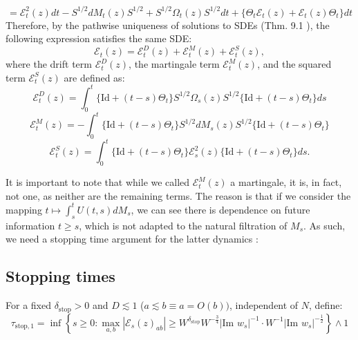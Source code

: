 \documentclass[11pt]{article}
\newcommand{\E}{\mathcal{E}}
\newcommand{\sto}{\text{stop}}
\newcommand{\im}{\text{Im }}
\begin{document}
$$= \E_t^2(z)dt - S^{1/2} dM_t(z)S^{1/2} + S^{1/2} \Omega_t(z) S^{1/2}dt + \{\Theta_t \E_t(z)+\E_t(z)\Theta_t\}dt$$
Therefore, by the pathwise uniqueness of solutions to SDEs (Thm. 9.1 \cite{steele}), the following expression satisfies the same SDE:
\begin{equation*}\E_t(z)=\E_t^{D}(z)+\E_t^{M}(z)+\E_t^{S}(z),\tag{3.3}\end{equation*}
where the drift term $\E^D_t(z)$, the martingale term $\E^M_t(z)$, and the squared term $\E^S_t(z)$ are defined as:
$$\E_t^{D}(z)=\int_0^t \{\text{Id} + (t-s)\Theta_t\} S^{1/2} \Omega_s(z) S^{1/2} \{\text{Id} + (t-s)\Theta_t\}ds$$
$$\E_t^{M}(z)=-\int_0^t \{\text{Id} + (t-s)\Theta_t\}S^{1/2} dM_s(z)S^{1/2}\{\text{Id} +(t-s)\Theta_t\}$$
$$\E_t^{S}(z)=\int_0^t \{\text{Id} + (t-s)\Theta_t\}\E_s^2(z) \{\text{Id} + (t-s)\Theta_t\}ds.$$

\noindent It is important to note that while we called $\E^M_t(z)$ a martingale, it is, in fact, not one, as neither are the remaining terms. The reason is that if we consider the mapping $t\mapsto \int_s^t U(t, s)dM_s$, we can see there is dependence on future information $t\geq s$, which is not adapted to the natural filtration of $M_s$. As such, we need a stopping time argument for the latter dynamics \cite{bandSDE}:

\subsection{Stopping times}
For a fixed $\delta_\sto>0$ and $D\lesssim 1$ ($a\lesssim b\equiv a = O(b))$, independent of $N$, define:
\begin{equation*}
\tau_{\text{stop}, 1}=\inf \left\{s\geq 0: \max_{a, b} |\E_s(z)_{ab}|\geq W^{\delta_{\sto}}W^{-\frac{3}{4}}|\im w_s|^{-1}\cdot W^{-1}|\im w_s|^{-\frac{1}{2}}\right\}\wedge 1
\tag{3.4.1}
\end{equation*}
\end{document}
